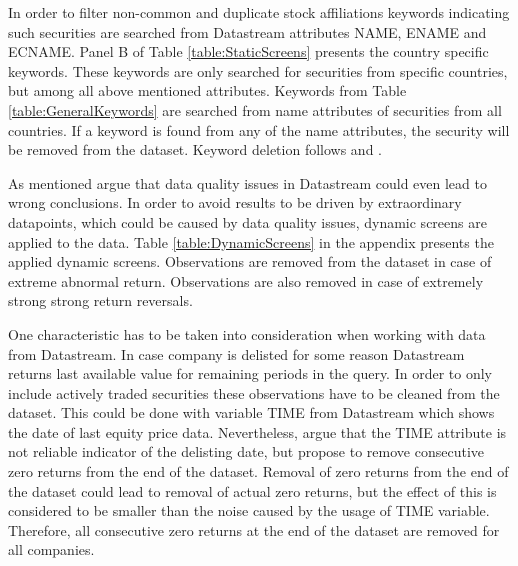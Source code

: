 \documentclass[12pt]{article}
\begin{document}
In order to filter non-common and duplicate stock affiliations keywords indicating such securities are searched from Datastream attributes NAME, ENAME and ECNAME. Panel B of Table \ref{table:StaticScreens} presents the country specific keywords. These keywords are only  searched for securities from specific countries, but among all above mentioned attributes. Keywords from Table \ref{table:GeneralKeywords} are searched from name attributes of securities from all countries. If a keyword is found from any of the name attributes, the security will be removed from the dataset. Keyword deletion follows \citet{Ince2006} and \citet{HANAUER2023106712}. \par

As mentioned \citet{Ince2006} argue that data quality issues in Datastream could even lead to wrong conclusions. In order to avoid results to be driven by extraordinary datapoints, which could be caused by data quality issues, dynamic screens are applied to the data. Table \ref{table:DynamicScreens} in the appendix presents the applied dynamic screens. Observations are removed from the dataset in case of extreme abnormal return. Observations are also removed in case of extremely strong strong return reversals.\par

One characteristic has to be taken into consideration when working with data from Datastream. In case company is delisted for some reason Datastream returns last available value for remaining periods in the query. In order to only include actively traded securities these observations have to be cleaned from the dataset. This could be done with variable TIME from Datastream which shows the date of last equity price data. Nevertheless, \citet{Ince2006} argue that the TIME attribute is not reliable indicator of the delisting date, but propose to remove consecutive zero returns from the end of the dataset. Removal of zero returns from the end of the dataset could lead to removal of actual zero returns, but the effect of this is considered to be smaller than the noise caused by the usage of TIME variable. Therefore, all consecutive zero returns at the end of the dataset are removed for all companies. \par
\end{document}
